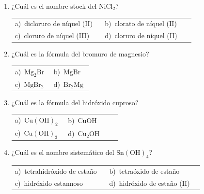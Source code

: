 \documentclass[11pt,a4paper]{article}
\begin{document}
\begin{enumerate}[label=\textbf{\arabic*.},leftmargin=*,itemsep=11pt,topsep=0pt]
\item \begin{minipage}[t]{\linewidth}
¿Cuál es el nombre stock del $\mathrm{NiCl_{2}}$?

\vspace{5pt}
\begin{tabular}{@{}p{0.47\linewidth}p{0.47\linewidth}@{}}
a)~dicloruro de níquel (II) & b)~clorato de níquel (II) \\
c)~cloruro de níquel (III) & d)~cloruro de níquel (II) \\
\end{tabular}
\end{minipage}

\item \begin{minipage}[t]{\linewidth}
¿Cuál es la fórmula del bromuro de magnesio?

\vspace{5pt}
\begin{tabular}{@{}p{0.47\linewidth}p{0.47\linewidth}@{}}
a)~$\mathrm{Mg_{2}Br}$ & b)~MgBr \\
c)~$\mathrm{MgBr_{2}}$ & d)~$\mathrm{Br_{2}Mg}$ \\
\end{tabular}
\end{minipage}

\item \begin{minipage}[t]{\linewidth}
¿Cuál es la fórmula del hidróxido cuproso?

\vspace{5pt}
\begin{tabular}{@{}p{0.47\linewidth}p{0.47\linewidth}@{}}
a)~$\mathrm{Cu(OH)_{2}}$ & b)~CuOH \\
c)~$\mathrm{Cu(OH)_{3}}$ & d)~$\mathrm{Cu_{2}OH}$ \\
\end{tabular}
\end{minipage}

\item \begin{minipage}[t]{\linewidth}
¿Cuál es el nombre sistemático del $\mathrm{Sn(OH)_{4}}$?

\vspace{5pt}
\begin{tabular}{@{}p{0.47\linewidth}p{0.47\linewidth}@{}}
a)~tetrahidróxido de estaño & b)~tetraóxido de estaño \\
c)~hidróxido estannoso & d)~hidróxido de estaño (II) \\
\end{tabular}
\end{minipage}


\end{enumerate}
\end{document}
